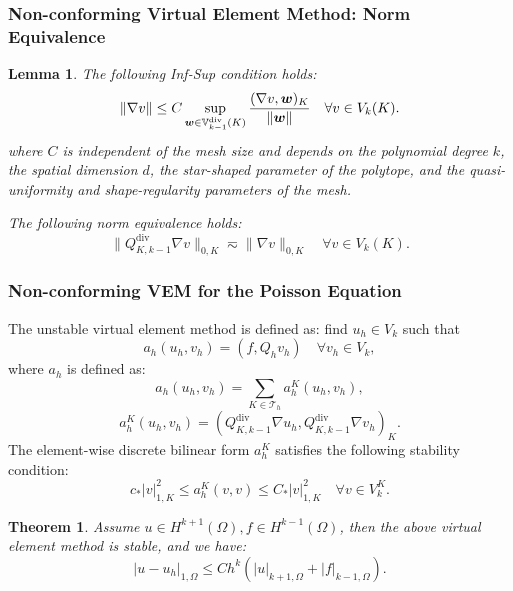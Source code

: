 \documentclass[notheorems,serif]{beamer}
\newtheorem{theorem}{\textbf{Theorem}}
\newtheorem{lemma}{\textbf{Lemma}}
\begin{document}
\begin{CJK}{UTF8}{gkai}
\begin{frame}
    \frametitle{Non-conforming Virtual Element Method: Norm Equivalence}
    \begin{lemma}
        The following Inf-Sup condition holds:
        $$
        \|\nabla v\| \leq C \sup_{\boldsymbol{w} \in
        \mathbb{V}^{\mathrm{div}}_{k-1}(K)}\frac{(\nabla v,
        \boldsymbol{w})_K}{\|\boldsymbol{w}\|} \quad \forall v \in V_k(K).
        $$
        where $C$ is independent of the mesh size and depends on the polynomial degree $k$, the spatial dimension $d$, the star-shaped parameter of the polytope, and the quasi-uniformity and shape-regularity parameters of the mesh.
        
        The following norm equivalence holds:
        $$
        \|Q_{K, k-1}^{\mathrm{div}}\nabla v\|_{0, K} \eqsim \|\nabla v\|_{0, K} 
        \quad \forall v \in V_k(K).
        $$
    \end{lemma}
\end{frame}

\begin{frame}
\frametitle{Non-conforming VEM for the Poisson Equation}
\small{
The unstable virtual element method is defined as: find $u_h \in V_k$ such that
$$
a_h(u_h, v_h) = (f, Q_h v_h) \quad \forall v_h \in V_k,
$$
where $a_h$ is defined as:
$$
a_h(u_h, v_h) = \sum_{K \in \mathcal{T}_h} a_h^K(u_h, v_h),
$$
$$
a_h^K(u_h, v_h) = (Q_{K, k-1}^{\mathrm{div}}\nabla u_h, Q_{K,
k-1}^{\mathrm{div}}\nabla v_h)_K.
$$
The element-wise discrete bilinear form 
$a_h^K$ satisfies the following stability condition:
$$
c_* |v|_{1, K}^2 \leq a_h^K(v, v) \leq C_* |v|_{1, K}^2 \quad \forall v \in
V_k^K.
$$
\begin{theorem}
Assume $u \in H^{k+1}(\Omega), f \in H^{k-1}(\Omega)$, then the above virtual element method
is stable, and we have:
$$
|u - u_h|_{1, \Omega} \leq C h^{k}
(|u|_{k+1, \Omega} + |f|_{k-1, \Omega}).
$$
\end{theorem}
}
\end{frame}


\end{CJK}
\end{document}
